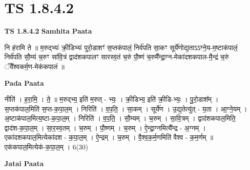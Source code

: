 \documentclass[17pt]{extarticle}
\begin{document}
\section{ TS 1.8.4.2 }

\textbf{TS 1.8.4.2 } \newline
\textbf{Samhita Paata} \newline

नि ह॑रामि ते ॥ म॒रुद्भ्यः॑ क्री॒डिभ्यः॑ पुरो॒डाशꣳ॑ स॒प्तक॑पालं॒ निर्व॑पति सा॒कꣳ सूर्ये॑णोद्य॒ताऽऽग्ने॒य-म॒ष्टाक॑पालं॒ निर्व॑पति सौ॒म्यं च॒रुꣳ सा॑वि॒त्रं द्वाद॑शकपालꣳ सारस्व॒तं च॒रुं पौ॒ष्णं च॒रुमै᳚न्द्रा॒ग्न-मेका॑दशकपाल-मै॒न्द्रं च॒रुं ॅवै᳚श्वकर्म॒ण-मेक॑कपालं ॥ \newline

\textbf{Pada Paata} \newline

नीति॑ । ह॒रा॒मि॒ । ते॒ ॥ म॒रुद्भ्य॒ इति॑ म॒रुत् - भ्यः॒ । क्री॒डिभ्य॒ इति॑ क्री॒डि-भ्यः॒ । पु॒रो॒डाश᳚म् । स॒प्तक॑पाल॒मिति॑ स॒प्त-क॒पा॒ल॒म् । निरिति॑ । व॒प॒ति॒ । सा॒कम् । सूर्ये॑ण । उ॒द्य॒तेत्यु॑त् - य॒ता । आ॒ग्ने॒यम् । अ॒ष्टाक॑पाल॒मित्य॒ष्टा-क॒पा॒ल॒म् । निरिति॑ । व॒प॒ति॒ । सौ॒म्यम् । च॒रुम् । सा॒वि॒त्रम् । द्वाद॑शकपाल॒मिति॒ द्वाद॑श-क॒पा॒ल॒म् । सा॒र॒स्व॒तम् । च॒रुम् । पौ॒ष्णम् । च॒रुम् । ऐ॒न्द्रा॒ग्नमित्यै᳚न्द्र - अ॒ग्नम् । एका॑दशकपाल॒मित्येका॑दश - क॒पा॒ल॒म् । ऐ॒न्द्रम् । च॒रुम् । वै॒श्व॒क॒र्म॒णमिति॑ वैश्व - क॒म॒र्णम् ॥ एक॑कपाल॒मित्येक॑-क॒पा॒ल॒म् । 6(30)  \newline



\textbf{Jatai Paata} \newline
\end{document}
